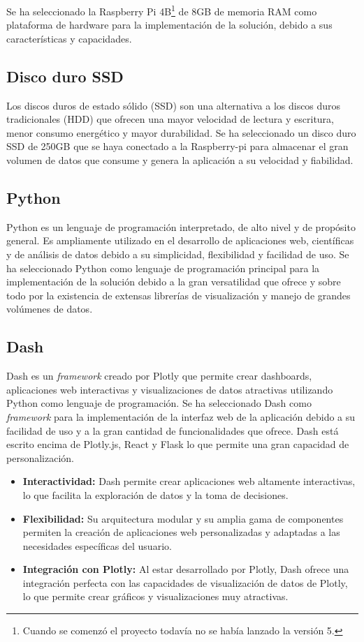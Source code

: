 \noindent Se ha seleccionado la Raspberry Pi 4B\footnote{Cuando se comenzó el proyecto todavía no se había lanzado la versión 5.} de 8GB de memoria RAM como plataforma de hardware para la implementación de la solución, debido a sus características y capacidades.

\subsection{Disco duro SSD}
Los discos duros de estado sólido (SSD) son una alternativa a los discos duros tradicionales (HDD) que ofrecen una mayor velocidad de lectura y escritura, menor consumo energético y mayor durabilidad. Se ha seleccionado un disco duro SSD de 250GB que se haya conectado a la Raspberry-pi para almacenar el gran volumen de datos que consume y genera la aplicación a su velocidad y fiabilidad.

\subsection{Python}
Python es un lenguaje de programación interpretado, de alto nivel y de propósito general. Es ampliamente utilizado en el desarrollo de aplicaciones web, científicas y de análisis de datos debido a su simplicidad, flexibilidad y facilidad de uso. Se ha seleccionado Python como lenguaje de programación principal para la implementación de la solución debido a la gran versatilidad que ofrece y sobre todo por la existencia de extensas librerías de visualización y manejo de grandes volúmenes de datos.

\subsection{Dash}
Dash es un \textit{framework} creado por Plotly que permite crear dashboards, aplicaciones web interactivas y visualizaciones de datos atractivas utilizando Python como lenguaje de programación. Se ha seleccionado Dash como \textit{framework} para la implementación de la interfaz web de la aplicación debido a su facilidad de uso y a la gran cantidad de funcionalidades que ofrece. Dash está escrito encima de Plotly.js, React y Flask lo que permite una gran capacidad de personalización.

\begin{itemize}
	\item \textbf{Interactividad:} Dash permite crear aplicaciones web altamente interactivas, lo que facilita la exploración de datos y la toma de decisiones.
	\item \textbf{Flexibilidad:} Su arquitectura modular y su amplia gama de componentes permiten la creación de aplicaciones web personalizadas y adaptadas a las necesidades específicas del usuario.
	\item \textbf{Integración con Plotly:} Al estar desarrollado por Plotly, Dash ofrece una integración perfecta con las capacidades de visualización de datos de Plotly, lo que permite crear gráficos y visualizaciones muy atractivas.
\end{itemize}

